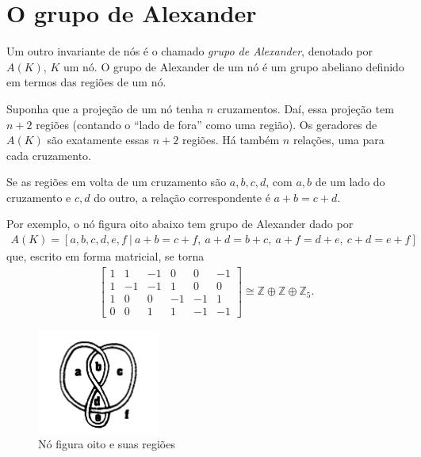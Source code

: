 	\section{O grupo de Alexander}
	Um outro invariante de nós é o chamado \textit{grupo de Alexander}, denotado por $A(K)$, 
	$K$ um nó. O grupo de Alexander de um nó é um grupo abeliano definido em termos das regiões de um nó.
	
	\par\vspace{0.3cm} Suponha que a projeção de um nó tenha $n$ cruzamentos. Daí, essa projeção 
	tem $n+2$ regiões (contando o ``lado de fora'' como uma região). Os geradores de $A(K)$ são 
	exatamente essas $n+2$ regiões. Há também $n$ relações, uma para cada cruzamento.
	
	\par\vspace{0.3cm} Se as regiões em volta de um cruzamento são $a,b,c,d$, com $a,b$ de um 
	lado do cruzamento e $c,d$ do outro, a relação correspondente é $a+b=c+d$.
	\begin{example}
    	Por exemplo, o nó figura oito abaixo tem grupo de Alexander dado por 
    	\begin{align*}
    	    A(K) = [a,b,c,d,e,f \ \vert \ a+b=c+f,\ a+d=b+c,\ a+f=d+e,\ c+d=e+f] 
    	\end{align*}
    	que, escrito em forma matricial, se torna
    	\begin{align*}
        	\begin{bmatrix}
        	1 & 1 & -1 & 0 & 0 & -1 \\
        	1 & -1 & -1 & 1 & 0 & 0 \\
        	1 & 0 & 0 & -1 & -1 & 1 \\
        	0 & 0 & 1 & 1 & -1 & -1 
        	\end{bmatrix}\cong\mathbb{Z}\oplus\mathbb{Z}\oplus\mathbb{Z}_5.
    	\end{align*}
    	\begin{figure}[H]
    	\label{exemplo grupo Alexander}
    		\begin{center}
    			\includegraphics[width=4cm]{Images/exemplo_grupo_alexander.png}
    		\end{center}\caption{Nó figura oito e suas regiões}
    	\end{figure}
	\end{example}
